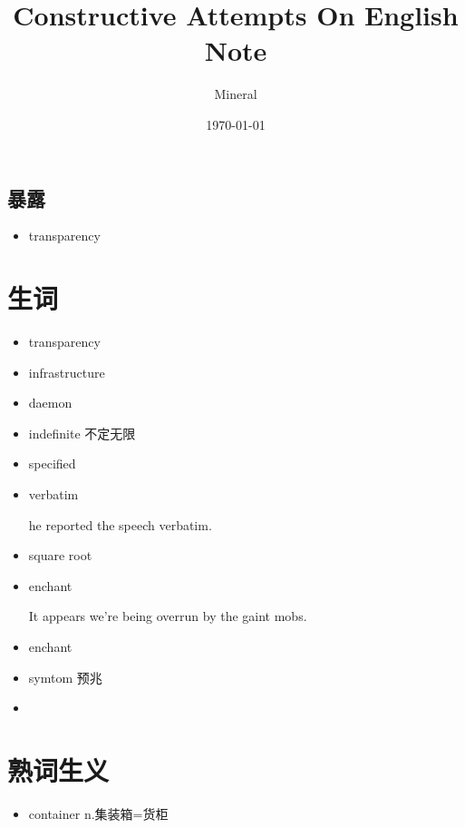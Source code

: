 \documentclass[utf8]{ctexart}
\author{Mineral}
\title{Constructive Attempts On English Note }
\date {\today}
\begin{document}
		\maketitle
		\subsection{暴露}
		\begin{itemize}
				\item transparency 
		\end{itemize}
		\section{生词}
		\begin{itemize}
				\item transparency
				\item infrastructure	
				\item daemon	
				\item indefinite  不定无限	
				\item specified	
				\item verbatim 
				\par he reported the speech verbatim.
				\item square root
				\item enchant	
				\par It appears we're being overrun by the gaint mobs.
				\item enchant	
				\item symtom 预兆
				\item 		



							
		\end{itemize}
		\section{熟词生义}
		\begin{itemize}
				\item container n.集装箱=货柜
		\end{itemize}
		
\end{document}
